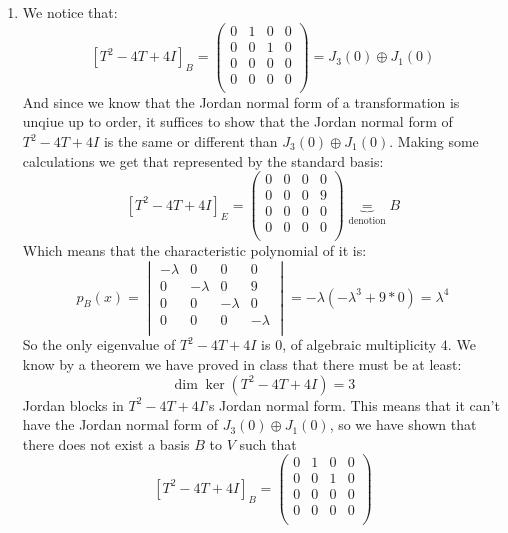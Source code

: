 \documentclass[11pt, a4paper]{article}
\begin{document}
\begin{solution} \phantom{}
\begin{enumerate}
  \item[(1)]
We notice that:
\[ [T^2-4T+4I]_B = 
\begin{pmatrix}
0 & 1 & 0 & 0\\
0 & 0 & 1 & 0\\
0 & 0 & 0 & 0\\
0 & 0 & 0 & 0\\
\end{pmatrix}    = J_3(0) \oplus J_1(0) \]
And since we know that the Jordan normal form of a transformation
is unqiue up to order, it suffices to show that the Jordan normal form
of $T^2-4T+4I$ is the same or different than $J_3(0) \oplus J_1(0)$.
Making some calculations we get that represented by the standard
basis:
\[
  [T^2-4T+4I]_E = 
  \begin{pmatrix}
  0 & 0 & 0 & 0\\
  0 & 0 & 0 & 9\\
  0 & 0 & 0 & 0\\
  0 & 0 & 0 & 0\\
  \end{pmatrix} \underbrace{=}_{\text{denotion}} B 
\]
Which means that the characteristic polynomial of it is:
\[
  p_{B}(x) = 
  \begin{vmatrix}
-\lambda & 0 & 0 & 0\\
0 & -\lambda & 0 & 9\\
0 & 0 & -\lambda & 0\\
0 & 0 & 0 & -\lambda\\
  \end{vmatrix} = 
  -\lambda(-\lambda^3+9*0) =
  \lambda^4
\]
So the only eigenvalue of $T^2-4T+4I$ is $0$, of algebraic multiplicity $4$.
We know by a theorem we have proved in class that there must be at least:
\[\dim\ker(T^2-4T+4I) = 3\]
Jordan blocks in $T^2-4T+4I$'s Jordan normal form. This means that it
can't have the Jordan normal form of $J_3(0) \oplus J_1(0)$, so we have
shown that there does not exist a basis $B$ to $V$ such that 
\[[T^2-4T+4I]_B = 
\begin{pmatrix}
0 & 1 & 0 & 0\\
0 & 0 & 1 & 0\\
0 & 0 & 0 & 0\\
0 & 0 & 0 & 0\\
\end{pmatrix}\]

\end{enumerate}
\end{solution}
\end{document}

